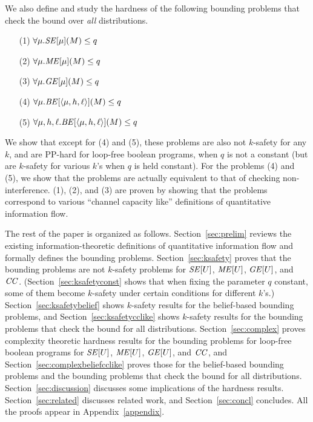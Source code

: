 \documentclass{llncs}
\newcommand{\aseq}[1]{\langle#1\rangle}
\begin{document}
We also define and study the hardness of the following bounding
problems that check the bound over {\em all} distributions.
\begin{itemize}
\item[(1)] $\forall \mu.{\it SE}[\mu](M)\le q$
\item[(2)] $\forall \mu.{\it ME}[\mu](M)\le q$
\item[(3)] $\forall \mu.{\it GE}[\mu](M)\le q$
\item[(4)] $\forall \mu.{\it BE}[\aseq{\mu,h,\ell}](M)\le q$
\item[(5)] $\forall \mu,h,\ell.{\it BE}[\aseq{\mu,h,\ell}](M)\le q$
\end{itemize}
We show that except for (4) and (5), these problems are also not
$k$-safety for any $k$, and are PP-hard for loop-free boolean
programs, when $q$ is not a constant (but are $k$-safety for various
$k$'s when $q$ is held constant).  For the problems (4) and (5), we
show that the problems are actually equivalent to that of checking
non-interference.  (1), (2), and (3) are proven by showing that
the problems correspond to various ``channel capacity like'' definitions
of quantitative information flow.

The rest of the paper is organized as follows.
Section~\ref{sec:prelim} reviews the existing information-theoretic
definitions of quantitative information flow and formally defines the
bounding problems.  Section~\ref{sec:ksafety} proves that the bounding
problems are not $k$-safety problems for ${\it SE}[U]$, ${\it ME}[U]$,
${\it GE}[U]$, and ${\it CC}$.  (Section~\ref{sec:ksafetyconst} shows
that when fixing the parameter $q$ constant, some of them become
$k$-safety under certain conditions for different $k$'s.)
Section~\ref{sec:ksafetybelief} shows $k$-safety results for the
belief-based bounding problems, and Section~\ref{sec:ksafetycclike}
shows $k$-safety results for the bounding problems that check the
bound for all distributions.  Section~\ref{sec:complex} proves
complexity theoretic hardness results for the bounding problems for
loop-free boolean programs for ${\it SE}[U]$, ${\it ME}[U]$, ${\it
  GE}[U]$, and ${\it CC}$, and Section~\ref{sec:complexbeliefcclike}
proves those for the belief-based bounding problems and the bounding
problems that check the bound for all distributions.
Section~\ref{sec:discussion} discusses some implications of the
hardness results.  Section~\ref{sec:related} discusses related work,
and Section~\ref{sec:concl} concludes.  All the proofs appear in
Appendix~\ref{appendix}.
\end{document}
